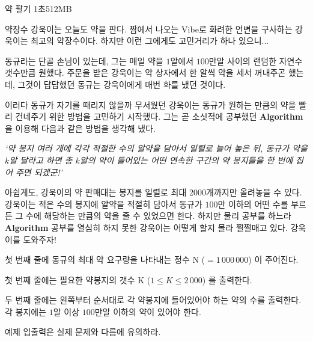 \begin{problem}{약 팔기}
{}{}
{1초}{512MB}{}

약장수 강욱이는 오늘도 약을 판다. 짬에서 나오는 Vibe로 화려한 언변을 구사하는 강욱이는 최고의 약장수이다. 하지만 이런 그에게도 고민거리가 하나 있으니...

동규라는 단골 손님이 있는데, 그는 매일 약을 $1$알에서 $100$만알 사이의 랜덤한 자연수 갯수만큼 원했다. 주문을 받은 강욱이는 약 상자에서 한 알씩 약을 세서 꺼내주곤 했는데, 그것이 답답했던 동규는 강욱이에게 매번 화를 냈던 것이다.

이러다 동규가 자기를 때리지 않을까 무서웠던 강욱이는 동규가 원하는 만큼의 약을 빨리 건네주기 위한 방법을 고민하기 시작했다. 그는 곧 소싯적에 공부했던 \textbf{Algorithm}을 이용해 다음과 같은 방법을 생각해 냈다.

\textit{`약 봉지 여러 개에 각각 적절한 수의 알약을 담아서 일렬로 늘어 놓은 뒤, 동규가 약을 $k$알 달라고 하면 총 $k$알의 약이 들어있는 어떤 연속한 구간의 약 봉지들을 한 번에 집어 주면 되겠군!'}

아쉽게도, 강욱이의 약 판매대는 봉지를 일렬로 최대 2000개까지만 올려놓을 수 있다. 강욱이는 적은 수의 봉지에 알약을 적절히 담아서 동규가 $100$만 이하의 어떤 수를 부르든 그 수에 해당하는 만큼의 약을 줄 수 있었으면 한다. 하지만 물리 공부를 하느라 \textbf{Algorithm} 공부를 열심히 하지 못한 강욱이는 어떻게 할지 몰라 쩔쩔매고 있다. 강욱이를 도와주자! 

\InputFile

첫 번째 줄에 동규의 최대 약 요구량을 나타내는 정수 N ($=1\, 000\, 000$) 이 주어진다.

\OutputFile

첫 번째 줄에는 필요한 약봉지의 갯수 K ($1 \le K \le 2\, 000$) 를 출력한다.

두 번째 줄에는 왼쪽부터 순서대로 각 약봉지에 들어있어야 하는 약의 수를 출력한다.
각 봉지에는 $1$알 이상 $100$만알 이하의 약이 있어야 한다.

\Examples
	
\begin{example}
%
\end{example}

\Note

예제 입출력은 실제 문제와 다름에 유의하라.

\blankpage

\end{problem}
